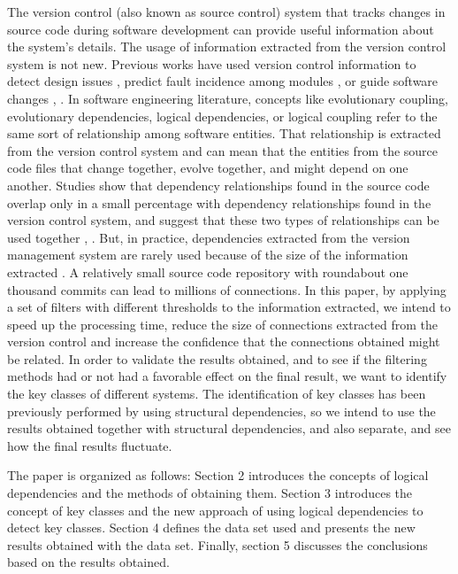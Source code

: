 \documentclass[runningheads]{comsis2}
\begin{document}
The version control (also known as source control) system that tracks changes in source code during software development can provide useful information about the system's details. 
The usage of information extracted from the version control system is not new. Previous works have used version control information to detect design issues \cite{Zimmermann:2004:MVH:998675.999460}, predict fault incidence among modules \cite{Predictingfaultincidence}, \cite{Cataldo2009SoftwareDW} or guide software changes \cite{4815274}, \cite{DBLP:journals/ese/AjienkaCC18}.
In software engineering literature, concepts like evolutionary coupling, evolutionary dependencies, logical dependencies, or logical coupling refer to the same sort of relationship among software entities. That relationship is extracted from the version control system and can mean that the entities from the source code files that change together, evolve together, and might depend on one another. Studies show that dependency relationships found in the source code overlap only in a small percentage with dependency relationships found in the version control system, and suggest that these two types of relationships can be used together \cite{Oliva:2011:ISL:2067853.2068086}, \cite{DBLP:journals/jss/AjienkaC17}. But, in practice, dependencies extracted from the version management system are rarely used because of the size of the information extracted \cite{Shtern:2012:CMS:2332427.2332428}. A relatively small source code repository with roundabout one thousand commits can lead to millions of connections. 
In this paper, by applying a set of filters with different thresholds to the information extracted, we intend to speed up the processing time, reduce the size of connections extracted from the version control and increase the confidence that the connections obtained might be related.
In order to validate the results obtained, and to see if the filtering methods had or not had a favorable effect on the final result, we want to identify the key classes of different systems. The identification of key classes has been previously performed by using structural dependencies, so
we intend to use the results obtained together with structural dependencies, and also separate, and see how the final results fluctuate.

The paper is organized as follows: Section 2 introduces the concepts of logical dependencies and the methods of obtaining them. Section 3 introduces the concept of key classes and the new approach of using logical dependencies to detect key classes. Section 4 defines the data set used and presents the new results obtained with the data set. Finally, section 5 discusses the conclusions based on the results obtained. 
\end{document}
